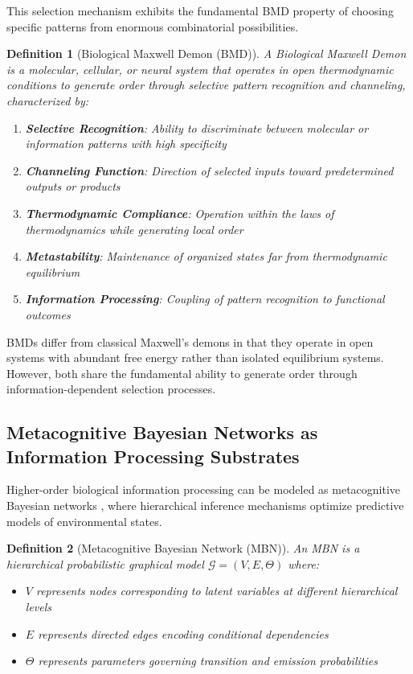 \documentclass[12pt,a4paper]{article}
\newtheorem{definition}{Definition}[section]
\begin{document}
This selection mechanism exhibits the fundamental BMD property of choosing specific patterns from enormous combinatorial possibilities.

\begin{definition}[Biological Maxwell Demon (BMD)]
A Biological Maxwell Demon is a molecular, cellular, or neural system that operates in open thermodynamic conditions to generate order through selective pattern recognition and channeling, characterized by:
\begin{enumerate}
\item \textbf{Selective Recognition}: Ability to discriminate between molecular or information patterns with high specificity
\item \textbf{Channeling Function}: Direction of selected inputs toward predetermined outputs or products
\item \textbf{Thermodynamic Compliance}: Operation within the laws of thermodynamics while generating local order
\item \textbf{Metastability}: Maintenance of organized states far from thermodynamic equilibrium
\item \textbf{Information Processing}: Coupling of pattern recognition to functional outcomes
\end{enumerate}
\end{definition}

BMDs differ from classical Maxwell's demons in that they operate in open systems with abundant free energy rather than isolated equilibrium systems. However, both share the fundamental ability to generate order through information-dependent selection processes.

\subsection{Metacognitive Bayesian Networks as Information Processing Substrates}

Higher-order biological information processing can be modeled as metacognitive Bayesian networks \citep{friston2010free, clark2013whatever}, where hierarchical inference mechanisms optimize predictive models of environmental states.

\begin{definition}[Metacognitive Bayesian Network (MBN)]
An MBN is a hierarchical probabilistic graphical model $\mathcal{G} = (V, E, \Theta)$ where:
\begin{itemize}
\item $V$ represents nodes corresponding to latent variables at different hierarchical levels
\item $E$ represents directed edges encoding conditional dependencies
\item $\Theta$ represents parameters governing transition and emission probabilities
\end{itemize}
\end{definition}
\end{document}
